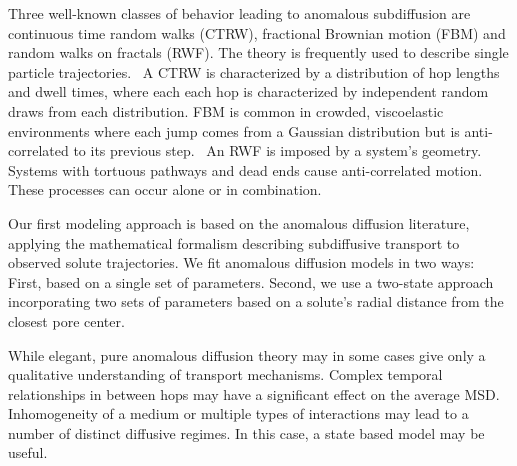 \documentclass{article}
\begin{document}
  Three well-known classes of behavior leading to anomalous subdiffusion are 
  continuous time random walks (CTRW), fractional Brownian motion
  (FBM) and random walks on fractals (RWF).\cite{meroz_toolbox_2015}
  The theory is frequently used to describe single particle trajectories.~\cite{morrin_three_2018,metzler_anomalous_2014}
  A CTRW is characterized by a distribution of hop lengths and dwell times, 
  where each each hop is characterized by independent random draws from 
  each distribution.\cite{montroll_random_1965} FBM is common in crowded,
  viscoelastic environments where each jump comes from a Gaussian distribution
  but is anti-correlated to its previous step.~\cite{mandelbrot_fractional_1968,jeon_fractional_2010,banks_anomalous_2005}
  An RWF is imposed by a system's geometry. Systems with tortuous pathways 
  and dead ends cause anti-correlated motion.\cite{meroz_toolbox_2015,neusius_subdiffusion_2008}
  These processes can occur alone or in combination.

  
  Our first modeling approach is based on the anomalous diffusion literature, 
  applying the mathematical formalism describing subdiffusive transport to observed
  solute trajectories. We fit anomalous diffusion models in two ways: 
  First, based on a single set of parameters. Second, we use a two-state approach incorporating
  two sets of parameters based on a solute's radial distance from the closest pore center. 
  
  While elegant, pure anomalous diffusion theory may in some cases give only a 
  qualitative understanding of transport mechanisms. 
  Complex temporal relationships in 
  between hops may have a significant effect on the average MSD. Inhomogeneity of 
  a medium or multiple types of interactions may lead to a number of distinct 
  diffusive regimes. In this case, a state based model may be useful. 
  
\end{document}
